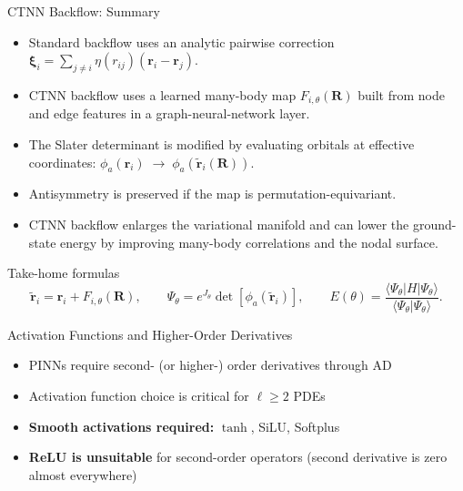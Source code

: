 \documentclass[aspectratio=169,10pt]{beamer}
\begin{document}
\begin{frame}{CTNN Backflow: Summary}
\begin{itemize}
  \item Standard backflow uses an analytic pairwise correction
        $\bm{\xi}_i=\sum_{j\neq i}\eta(r_{ij})(\mathbf{r}_i-\mathbf{r}_j)$.
  \item CTNN backflow uses a learned many-body map $F_{i,\theta}(\mathbf{R})$
        built from node and edge features in a graph-neural-network layer.
  \item The Slater determinant is modified by evaluating orbitals at
        effective coordinates:
        $\phi_a(\mathbf{r}_i)\;\to\;\phi_a(\tilde{\mathbf{r}}_i(\mathbf{R}))$.
  \item Antisymmetry is preserved if the map is permutation-equivariant.
  \item CTNN backflow enlarges the variational manifold and can lower the
        ground-state energy by improving many-body correlations and the
        nodal surface.
\end{itemize}
\vspace{0.2cm}
\begin{alertblock}{Take-home formulas}
  \[
    \tilde{\mathbf{r}}_i=\mathbf{r}_i+F_{i,\theta}(\mathbf{R}),
    \qquad
    \Psi_\theta=e^{J_\theta}\det[\phi_a(\tilde{\mathbf{r}}_i)],
    \qquad
    E(\theta)=\frac{\langle\Psi_\theta|H|\Psi_\theta\rangle}
                   {\langle\Psi_\theta|\Psi_\theta\rangle}.
  \]
\end{alertblock}
\end{frame}


\begin{frame}{Activation Functions and Higher-Order Derivatives}
      \begin{itemize}
        \item PINNs require second- (or higher-) order derivatives through AD
        \item Activation function choice is critical for $\ell \ge 2$ PDEs
        \item \textbf{Smooth activations required:} $\tanh$, SiLU, Softplus
        \item \textbf{ReLU is unsuitable} for second-order operators
              (second derivative is zero almost everywhere)
      \end{itemize}
\end{frame}
\end{document}
